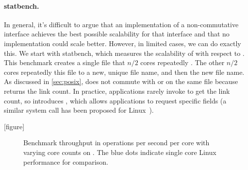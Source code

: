 
\paragraph{statbench.} In general, it's difficult to argue that an
implementation of a
non-commutative interface achieves the best possible scalability for
that interface and that no implementation could scale better.  However,
in limited cases, we can do exactly this.  We start with statbench,
which measures the scalability of  with respect to
.  This benchmark creates a single file that $n/2$ cores
repeatedly . The other $n/2$ cores repeatedly
 this file to a new, unique file name, and then 
the new file name.  As discussed in \cref{sec:posix},  does not
commute with  or  on the same file because
 returns the link count.  In practice,
applications rarely invoke  to get the link count, so \sys
introduces , which allows applications to request specific
fields (a similar system call has been proposed for
Linux~\cite{linux:xstat}).


[figure]
\renewcommand{\themysubfigure}{\thefigure(\alph{mysubfigure})}

\begin{figure*}
  
  \label{fig:linkbench}
  \hspace{-.22in}
  
  \label{fig:fdbench}
  \addtocounter{figure}{-1}
  \caption{Benchmark throughput in operations per second per core with
    varying core counts on \sys.
    The blue dots indicate single core Linux
    performance for comparison.}
\end{figure*}

%   

